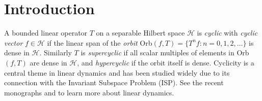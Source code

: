 \documentclass[11pt]{amsart}%
\numberwithin{equation}{section}
\theoremstyle{plain}
\theoremstyle{definition}
\theoremstyle{definition}
\begin{document}
\section{Introduction}

A bounded linear operator $T$ on a separable Hilbert space $\mathcal{H}$ is \emph{cyclic} with \emph{cyclic vector} $f\in\mathcal{H}$ if the linear span of the \emph{orbit} Orb$(f,T)=\{T^nf:n=0,1,2,\ldots\}$ is dense in $\mathcal{H}$. Similarly $T$ is \emph{supercyclic} if all scalar multiples of elements in Orb$(f,T)$ are dense in $\mathcal{H}$, and \emph{hypercyclic} if the orbit itself is dense. Cyclicity is a central theme in linear dynamics and has been studied widely due to its connection with the Invariant Subspace Problem (ISP). See the recent monographs \cite{Bayart-Matheron} and \cite{Linear Chaos} to learn more about linear dynamics. 
\end{document}
